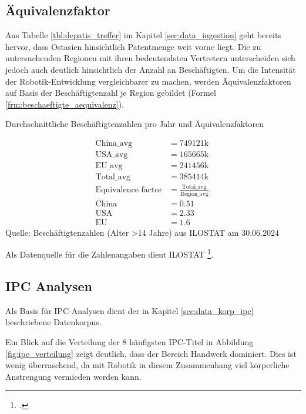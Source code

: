 \subsection{Äquivalenzfaktor}\label{sec:aquiv_fakt}

Aus Tabelle \ref{tbl:depatis_treffer} im Kapitel \ref{sec:data_ingestion} geht bereits hervor, dass Ostasien hinsichtlich Patentmenge weit vorne liegt. Die zu untersuchenden Regionen mit ihren bedeutendsten Vertretern unterscheiden sich jedoch auch deutlich hinsichtlich der Anzahl an Beschäftigten. Um die Intensität der Robotik-Entwicklung vergleichbarer zu machen, werden Äquivalenzfaktoren auf Basis der Beschäftigtenzahl je Region gebildet (Formel \ref{frm:beschaeftigte_aequivalenz}).
\begin{formel}[h]
	\caption{Durchschnittliche Beschäftigtenzahlen pro Jahr und Äquivalenzfaktoren}
	\label{frm:beschaeftigte_aequivalenz}
	\begin{align}
\text{China\_avg} &= 749121\text{k} \\
\text{USA\_avg} &= 165665\text{k} \\
\text{EU\_avg} &= 241456\text{k} \\
\text{Total\_avg} &= 385414\text{k} \\
\text{Equivalence factor} &= \frac{\text{Total\_avg}}{\text{Region\_avg}} \text{.} \\
\text{China} &= 0.51 \\
\text{USA} &= 2.33 \\
\text{EU} &= 1.6
	\end{align}
	\vspace{0.5em}
	\normalsize{Quelle: Beschäftigtenzahlen (Alter >14 Jahre) aus ILOSTAT am 30.06.2024}
	\vspace{-1.0em}
\end{formel}
Als Datenquelle für die Zahlenangaben dient \Ac{ILOSTAT} \footcite{website:ilostat}.

\subsection{\ac{IPC} Analysen}\label{sec:ipc_analysis}

Als Basis für \ac{IPC}-Analysen dient der in Kapitel \ref{sec:data_korp_ipc} beschriebene Datenkorpus. 

Ein Blick auf die Verteilung der 8 häufigsten \ac{IPC}-Titel in Abbildung \ref{fig:ipc_verteilung} zeigt deutlich, dass der Bereich Handwerk dominiert. Dies ist wenig überraschend, da mit Robotik in diesem Zusammenhang viel körperliche Anstrengung vermieden werden kann.

